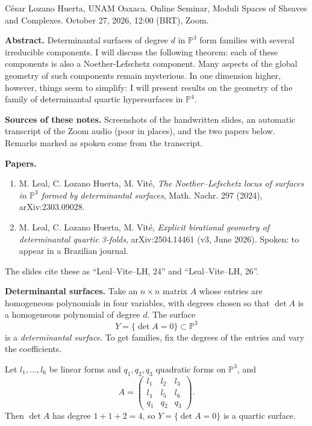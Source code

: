 \noindent
César Lozano Huerta, UNAM Oaxaca.
Online Seminar, Moduli Spaces of Sheaves
and Complexes.
October 27, 2026, 12:00 (BRT), Zoom.

\medskip\noindent
{\bf Abstract.}
Determinantal surfaces of degree $d$ in
$\mathbb{P}^3$ form families with several
irreducible components. I will discuss the
following theorem: each of these components
is also a Noether-Lefschetz component. Many
aspects of the global geometry of such
components remain mysterious. In one
dimension higher, however, things seem to
simplify: I will present results on the
geometry of the family of determinantal
quartic hypersurfaces in $\mathbb{P}^4$.

\medskip\noindent
{\bf Sources of these notes.} Screenshots of
the handwritten slides, an automatic
transcript of the Zoom audio (poor in
places), and the two papers below. Remarks
marked as spoken come from the transcript.

\medskip\noindent
{\bf Papers.}
\begin{enumerate}
\item M. Leal, C. Lozano Huerta,
M. Vité, \emph{The Noether--Lefschetz locus
of surfaces in $\mathbb{P}^3$ formed by
determinantal surfaces}, Math. Nachr. 297
(2024), arXiv:2303.09028.
\item M. Leal, C. Lozano Huerta,
M. Vité, \emph{Explicit birational geometry
of determinantal quartic 3-folds},
arXiv:2504.14461 (v3, June 2026).
Spoken: to appear in a Brazilian journal.
\end{enumerate}
The slides cite these as ``Leal--Vite--LH,
24'' and ``Leal--Vite--LH, 26''.

\medskip\noindent
{\bf Determinantal surfaces.} Take an
$n \times n$ matrix $A$ whose entries are
homogeneous polynomials in four variables,
with degrees chosen so that $\det A$ is a
homogeneous polynomial of degree $d$. The
surface
$$
Y = \{ \det A = 0 \} \subset \mathbb{P}^3
$$
is a \emph{determinantal surface}. To get
families, fix the degrees of the entries and
vary the coefficients.

\begin{example}
\label{example-lozano-3x3}
Let $l_1,\ldots,l_6$ be linear forms and
$q_1,q_2,q_3$ quadratic forms on
$\mathbb{P}^3$, and
$$
A =
\begin{pmatrix}
l_1 & l_2 & l_3 \\
l_4 & l_5 & l_6 \\
q_1 & q_2 & q_3
\end{pmatrix}.
$$
Then $\det A$ has degree $1+1+2 = 4$, so
$Y = \{ \det A = 0 \}$ is a quartic surface.
\end{example}

